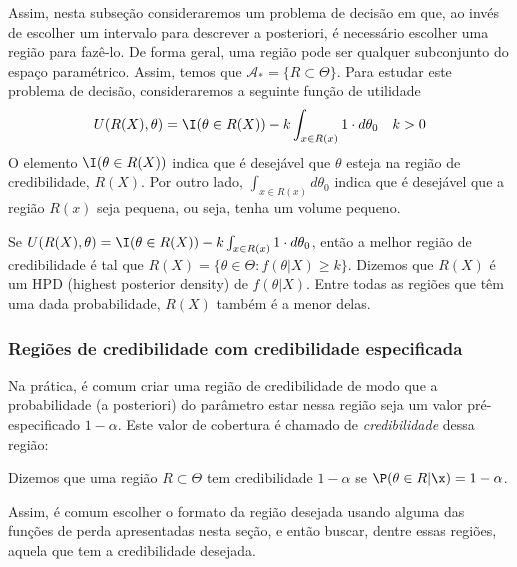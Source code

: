 Assim, nesta subseção consideraremos 
um problema de decisão em que,
ao invés de escolher um intervalo para 
descrever a posteriori,
é necessário escolher uma região para fazê-lo.
De forma geral, uma região pode ser 
qualquer subconjunto do espaço paramétrico.
Assim, temos que
$\mathcal{A}_{*} = \{R \subset \Theta\}$.
Para estudar este problema de decisão,
consideraremos a seguinte função de utilidade
\begin{align*}
U(R(X),\theta)	
&= \I(\theta \in R(X)) 
-k\int_{x \in R(x)}{1 \cdot d\theta_0}
& k > 0
\end{align*}
O elemento $\I(\theta \in R(X))$ indica que 
é desejável que $\theta$ esteja 
na região de credibilidade, $R(X)$.
Por outro lado,  $\int_{x \in R(x)}{d\theta_0}$ indica que
é desejável que a região $R(x)$ seja pequena, 
ou seja, tenha um volume pequeno.
\begin{theorem}
\label{thm:hpd}
Se $U(R(X),\theta)	= \I(\theta \in R(X)) - k\int_{x \in R(x)}{1 \cdot d\theta_0}$, então 
a melhor região de credibilidade é tal que 
$R(X) = \{\theta \in \Theta: f(\theta|X) \geq k\}$.
Dizemos que $R(X)$ é um HPD (highest posterior density) 
de $f(\theta|X)$.
Entre todas as regiões que têm uma dada probabilidade,
$R(X)$ também é a menor delas.
\end{theorem}


\subsubsection{Regiões de credibilidade com credibilidade especificada}
\label{sec:credibilidade}


Na prática, é comum criar uma região de credibilidade
de modo que a probabilidade (a posteriori) do parâmetro estar nessa região
seja um valor pré-especificado $1-\alpha$. Este valor de cobertura é chamado de 
\emph{credibilidade} dessa região:
\begin{definition}
Dizemos que uma região $R \subset \Theta$ tem credibilidade $1-\alpha$
se $\P(\theta \in R|\x)=1-\alpha$.
\end{definition}

Assim, é comum escolher o formato da região desejada usando 
alguma das funções de perda apresentadas nesta seção, e então buscar, dentre essas regiões,
aquela que tem a credibilidade desejada.

